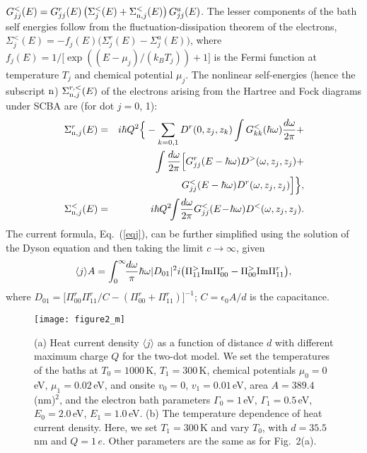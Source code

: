 \documentclass[doublecol]{epl2}
\begin{document}
$G^<_{jj}(E) = G^r_{jj}(E) \left(\Sigma^{<}_j(E) + \Sigma^{<}_{{\rm n},j}(E)\right) G^a_{jj}(E)$.
The lesser components of the bath self energies follow from the fluctuation-dissipation
theorem of the electrons, $\Sigma^{<}_j(E) = - f_j(E) \bigl(\Sigma^r_j(E) - \Sigma^a_j(E) \bigr)$, where
$f_j(E) = 1/\bigl[\exp((E-\mu_j)/(k_B T_j)) + 1\bigr]$ is the Fermi function at temperature $T_j$ and
chemical potential $\mu_j$. 
The nonlinear self-energies (hence the subscript ${\rm n}$) $\Sigma^{r,<}_{{\rm n},j}(E)$ of the electrons arising from the Hartree and Fock diagrams under SCBA \cite{lu2007,zhanglifa2013} are (for dot $j=0$, 1):
\begin{eqnarray}
\Sigma_{{\rm n},j}^r(E) &= &i\hbar Q^2 \Big\{ -\sum_{k=0,1}D^r(0,z_j,z_k) \int G_{kk}^<(\hbar \omega) \frac{d\omega}{2\pi} + 
\nonumber \\
& & \int\frac{d\omega}{2\pi} \Big[ G_{jj}^r(E-\hbar \omega)D^>(\omega,z_j,z_j) +\nonumber \\
& &G^<_{jj}(E-\hbar \omega) D^r(\omega,z_j,z_j)  \Big]  \Big\}, \\
\Sigma^<_{{\rm n},j}(E) &=& i\hbar Q^2\!\! \int\! \frac{d\omega}{2\pi} G^<_{jj}(E \!-\! \hbar \omega) D^<(\omega,z_j,z_j).
\end{eqnarray} 
The current formula, Eq.~(\ref{eqj}), can be further simplified using the solution of the Dyson equation and then taking
the limit $c\to \infty$, given
\begin{equation}
\langle j \rangle A = \int_0^{\infty}\!\! { d\omega \over \pi} \hbar \omega
|D_{01}|^2 i \bigl( 
  \Pi_{11}^{>} {\rm Im} \Pi_{00}^r
- \Pi_{00}^{>} {\rm Im} \Pi_{11}^r
\bigr),
\end{equation}
where $D_{01} = \bigl[\Pi_{00}^r \Pi_{11}^r/C - (\Pi_{00}^r + \Pi_{11}^r)\bigr]^{-1}$; $C=\epsilon_0 A/d$ is the capacitance.

\begin{figure}
\texttt{[image: figure2\_m]}%
\caption{(a) Heat current density $\langle j\rangle$ as a function of distance $d$ with different maximum charge $Q$ for the two-dot model. We set the temperatures of the baths at $T_0=1000\,$K, $T_1=300\,$K, chemical potentials $\mu_0=0\,$eV, $\mu_1=0.02\,$eV, and 
onsite $v_0=0$, $v_1=0.01\,$eV, area $A=389.4$ (nm)$^2$,  and the electron bath parameters $\Gamma_0 = 1\,$eV, $\Gamma_1=0.5\,$eV,
$E_0 =2.0\,$eV, $E_1 = 1.0\,$eV.
(b) The temperature dependence of heat current density. Here, we set $T_1=300\,$K and vary $T_0$, with $d=35.5\,$nm and $Q= 1\, e$. Other parameters are the same as for Fig.~2(a). }
\end{figure}
\end{document}
